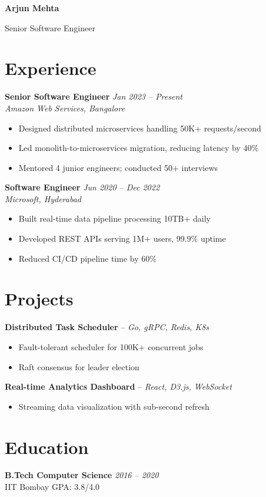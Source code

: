 \documentclass[10pt,a4paper]{article}
\begin{document}
\begin{minipage}[t]{11.5cm}
\vspace{0.3cm}

{\Huge\bfseries\color{accent} Arjun Mehta}\par\vspace{2pt}
{\large Senior Software Engineer}\par\vspace{10pt}

\section{Experience}
\textbf{Senior Software Engineer} \hfill \textit{Jan 2023 -- Present}\\
\textit{Amazon Web Services, Bangalore}
\begin{itemize}[leftmargin=*, itemsep=0pt, topsep=2pt]
\item \small Designed distributed microservices handling 50K+ requests/second
\item \small Led monolith-to-microservices migration, reducing latency by 40\%
\item \small Mentored 4 junior engineers; conducted 50+ interviews
\end{itemize}
\vspace{6pt}

\textbf{Software Engineer} \hfill \textit{Jun 2020 -- Dec 2022}\\
\textit{Microsoft, Hyderabad}
\begin{itemize}[leftmargin=*, itemsep=0pt, topsep=2pt]
\item \small Built real-time data pipeline processing 10TB+ daily
\item \small Developed REST APIs serving 1M+ users, 99.9\% uptime
\item \small Reduced CI/CD pipeline time by 60\%
\end{itemize}
\vspace{6pt}

\section{Projects}
\textbf{Distributed Task Scheduler} -- \textit{Go, gRPC, Redis, K8s}
\begin{itemize}[leftmargin=*, itemsep=0pt, topsep=2pt]
\item \small Fault-tolerant scheduler for 100K+ concurrent jobs
\item \small Raft consensus for leader election
\end{itemize}
\vspace{4pt}
\textbf{Real-time Analytics Dashboard} -- \textit{React, D3.js, WebSocket}
\begin{itemize}[leftmargin=*, itemsep=0pt, topsep=2pt]
\item \small Streaming data visualization with sub-second refresh
\end{itemize}

\section{Education}
\textbf{B.Tech Computer Science} \hfill \textit{2016 -- 2020}\\
IIT Bombay \hfill GPA: 3.8/4.0

\end{minipage}
\end{document}
